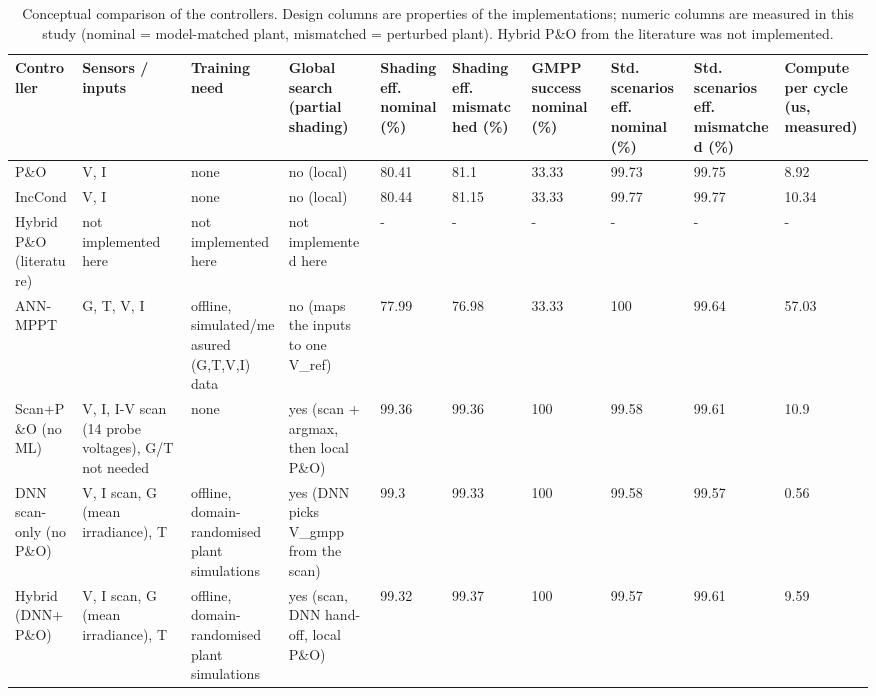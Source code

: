 \begin{table}[t]
\centering
\caption{Conceptual comparison of the controllers. Design columns are properties of the implementations; numeric columns are measured in this study (nominal = model-matched plant, mismatched = perturbed plant). Hybrid P\&O from the literature was not implemented.}
\label{tab:Table_conceptual_comparison}
\small
\begin{tabular}{llllllllll}
\hline
Controller & Sensors / inputs & Training need & Global search (partial shading) & Shading eff. nominal (\%) & Shading eff. mismatched (\%) & GMPP success nominal (\%) & Std. scenarios eff. nominal (\%) & Std. scenarios eff. mismatched (\%) & Compute per cycle (us, measured) \\
\hline
P\&O & V, I & none & no (local) & 80.41 & 81.1 & 33.33 & 99.73 & 99.75 & 8.92 \\
IncCond & V, I & none & no (local) & 80.44 & 81.15 & 33.33 & 99.77 & 99.77 & 10.34 \\
Hybrid P\&O (literature) & not implemented here & not implemented here & not implemented here & - & - & - & - & - & - \\
ANN-MPPT & G, T, V, I & offline, simulated/measured (G,T,V,I) data & no (maps the inputs to one V\_ref) & 77.99 & 76.98 & 33.33 & 100 & 99.64 & 57.03 \\
Scan+P\&O (no ML) & V, I, I-V scan (14 probe voltages), G/T not needed & none & yes (scan + argmax, then local P\&O) & 99.36 & 99.36 & 100 & 99.58 & 99.61 & 10.9 \\
DNN scan-only (no P\&O) & V, I scan, G (mean irradiance), T & offline, domain-randomised plant simulations & yes (DNN picks V\_gmpp from the scan) & 99.3 & 99.33 & 100 & 99.58 & 99.57 & 0.56 \\
Hybrid (DNN+P\&O) & V, I scan, G (mean irradiance), T & offline, domain-randomised plant simulations & yes (scan, DNN hand-off, local P\&O) & 99.32 & 99.37 & 100 & 99.57 & 99.61 & 9.59 \\
\hline
\end{tabular}
\end{table}
